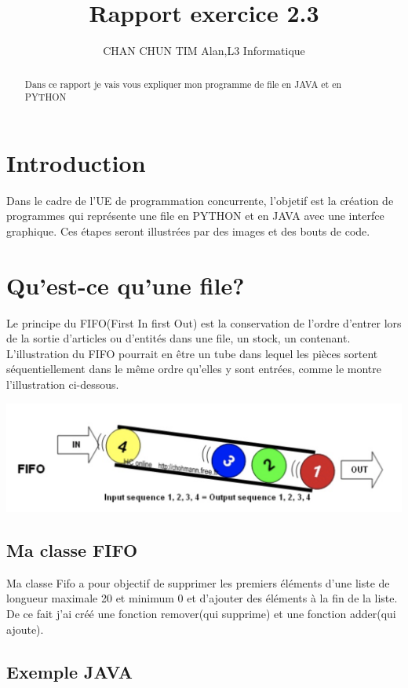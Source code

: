 \documentclass[13pt]{article}
\title{Rapport exercice 2.3}
\author{CHAN CHUN TIM Alan,L3 Informatique}
\begin{document}
\maketitle %
\begin{abstract}
Dans ce rapport je vais vous expliquer mon programme de file en JAVA et en PYTHON 
\end{abstract}
\section{Introduction}
\label{section:Introduction} %
Dans le cadre de l'UE de programmation concurrente, l'objetif est la création de programmes qui représente une file en PYTHON et en JAVA avec une interfce graphique. Ces étapes seront illustrées par des images et des bouts de code.
\section{Qu'est-ce qu'une file?}
Le principe du FIFO(First In first Out) est la conservation de l'ordre d'entrer lors de la sortie d'articles ou d'entités dans une file, un stock, un contenant. L'illustration du FIFO pourrait en être un tube dans lequel les pièces sortent séquentiellement dans le même ordre qu'elles y sont entrées, comme le montre l'illustration ci-dessous.
\begin{center}
  \includegraphics[scale=0.5]{image1.png}
\end{center}
\subsection{Ma classe FIFO}
Ma classe Fifo a pour objectif de supprimer les premiers éléments d'une liste de longueur maximale 20 et minimum 0 et d'ajouter des éléments à la fin de la liste.
De ce fait j'ai créé une fonction remover(qui supprime) et une fonction adder(qui ajoute).
\subsection{Exemple JAVA}
\end{document}
